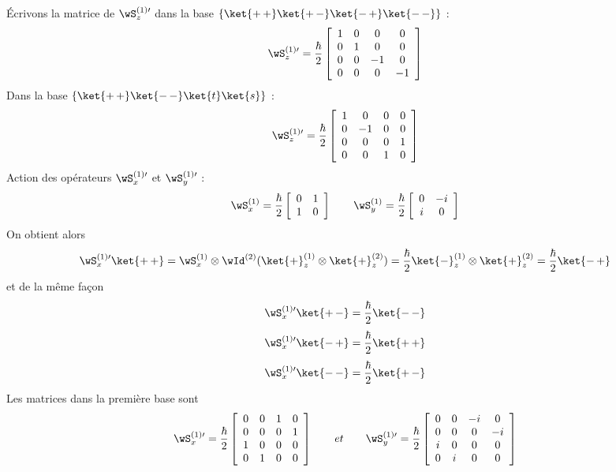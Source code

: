Écrivons la matrice de $\wS_z^{(1)\prime}$ dans la base $\{\ket{+\,+}
\ket{+\,-}\ket{-\,+}\ket{-\,-}\}$ :
\[
\wS_z^{(1)\prime}=\frac{\hbar}{2}\left[\begin{array}{ c c c c }
 1 & 0 & 0 & 0 \\
 0 & 1 & 0 & 0 \\
 0 & 0 & -1 & 0 \\
 0 & 0 & 0 & -1 \\
\end{array}\right]
\]
Dans la base $\{\ket{+\,+}\ket{-\,-}\ket{t}\ket{s}\}$ :
\[
\wS_z^{(1)\prime}=\frac{\hbar}{2}\left[\begin{array}{ c c c c }
 1 & 0 & 0 & 0 \\
 0 & -1 & 0 & 0 \\
 0 & 0 & 0 & 1 \\
 0 & 0 & 1 & 0 \\
\end{array}\right]
\]
Action des opérateurs $\wS_x^{(1)\prime}$ et $\wS_y^{(1)\prime}$ :
\[
\wS_x^{(1)}=\frac{\hbar}{2}\left[\begin{array}{ c c }
 0 & 1 \\ 1 & 0 \\ \end{array}\right] \qquad
\wS_y^{(1)}=\frac{\hbar}{2}\left[\begin{array}{ c c }
 0 & -i \\ i & 0 \\ \end{array}\right]
\]
On obtient alors
\[
\wS_x^{(1)\prime}\ket{+\,+}=\wS_x^{(1)}\otimes\wId^{(2)}
(\ket{+}_z^{(1)}\otimes\ket{+}_z^{(2)})
=\frac{\hbar}{2}\ket{-}_z^{(1)}\otimes\ket{+}_z^{(2)}
=\frac{\hbar}{2}\ket{-\,+}
\]
et de la même façon
\[
\wS_x^{(1)\prime}\ket{+\,-}=\frac{\hbar}{2}\ket{-\,-}
\]
\[
\wS_x^{(1)\prime}\ket{-\,+}=\frac{\hbar}{2}\ket{+\,+}
\]
\[
\wS_x^{(1)\prime}\ket{-\,-}=\frac{\hbar}{2}\ket{+\,-}
\]
Les matrices dans la première base sont
\[
\wS_x^{(1)\prime}=\frac{\hbar}{2}\left[\begin{array}{ c c c c }
 0 & 0 & 1 & 0 \\ 0 & 0 & 0 & 1 \\
 1 & 0 & 0 & 0 \\ 0 & 1 & 0 & 0 \\
\end{array}\right]\qquad et\qquad
\wS_y^{(1)\prime}=\frac{\hbar}{2}\left[\begin{array}{ c c c c }
 0 & 0 & -i & 0 \\
 0 & 0 & 0 & -i \\
 i & 0 & 0 & 0 \\
 0 & i & 0 & 0 \\
\end{array}\right]
\]
